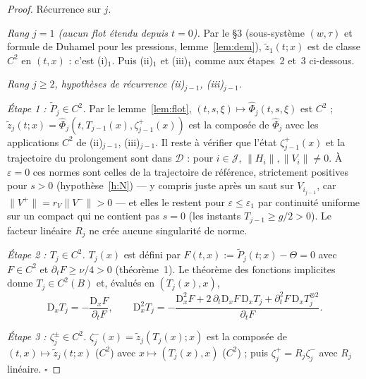 \documentclass[11pt,a4paper]{article}
\theoremstyle{remark}
\theoremstyle{definition}
\newcommand{\norm}[1]{\lVert #1\rVert}
\newcommand{\eps}{\varepsilon}
\newcommand{\zt}{\widetilde z}
\newcommand{\Pt}{\widetilde P}
\newcommand{\D}{\mathrm D}
\begin{document}
\begin{proof}
Récurrence sur $j$.

\emph{Rang $j=1$ (aucun flot étendu depuis $t=0$).} Par le §3 (sous-système $(w,\tau)$ et formule de Duhamel pour les pressions, lemme~\ref{lem:dem}), $\zt_1(t;x)$ est de classe $C^2$ en $(t,x)$ : c'est (i)$_1$. Puis (ii)$_1$ et (iii)$_1$ comme aux étapes~2 et~3 ci-dessous.

\emph{Rang $j\ge2$, hypothèses de récurrence (ii)$_{j-1}$, (iii)$_{j-1}$.}

\emph{Étape 1 : $\Pt_j\in C^2$.} Par le lemme~\ref{lem:flot}, $(t,s,\xi)\mapsto\hat\Phi_j(t,s,\xi)$ est $C^2$ ; $\zt_j(t;x)=\hat\Phi_j(t,T_{j-1}(x),\zeta^+_{j-1}(x))$ est la composée de $\hat\Phi_j$ avec les applications $C^2$ de (ii)$_{j-1}$, (iii)$_{j-1}$. Il reste à vérifier que l'état $\zeta^+_{j-1}(x)$ et la trajectoire du prolongement sont dans $\mathcal D$ : pour $i\in\mathcal J$, $\norm{H_i},\norm{V_i}\ne0$. À $\eps=0$ ces normes sont celles de la trajectoire de référence, strictement positives pour $s>0$ (hypothèse~\ref{h:N}) --- y compris juste après un saut sur $V_{i_{j-1}}$, car $\norm{V^+}=r_V\norm{V^-}>0$ --- et elles le restent pour $\eps\le\eps_1$ par continuité uniforme sur un compact qui ne contient pas $s=0$ (les instants $T_{j-1}\ge g/2>0$). Le facteur linéaire $R_j$ ne crée aucune singularité de norme.

\emph{Étape 2 : $T_j\in C^2$.} $T_j(x)$ est défini par $F(t,x):=\Pt_j(t;x)-\Theta=0$ avec $F\in C^2$ et $\partial_tF\ge\nu/4>0$ (théorème~1). Le théorème des fonctions implicites donne $T_j\in C^2(B)$ et, évalués en $(T_j(x),x)$,
\[
\D_xT_j=-\frac{\D_xF}{\partial_tF},\qquad
\D^2_xT_j=-\frac{\D^2_xF+2\,\partial_t\D_xF\,\D_xT_j+\partial_t^2F\,\D_xT_j^{\otimes2}}{\partial_tF}.
\]

\emph{Étape 3 : $\zeta^\pm_j\in C^2$.} $\zeta^-_j(x)=\zt_j(T_j(x);x)$ est la composée de $(t,x)\mapsto\zt_j(t;x)$ ($C^2$) avec $x\mapsto(T_j(x),x)$ ($C^2$) ; puis $\zeta^+_j=R_j\zeta^-_j$ avec $R_j$ linéaire. $\square$
\end{proof}
\end{document}
